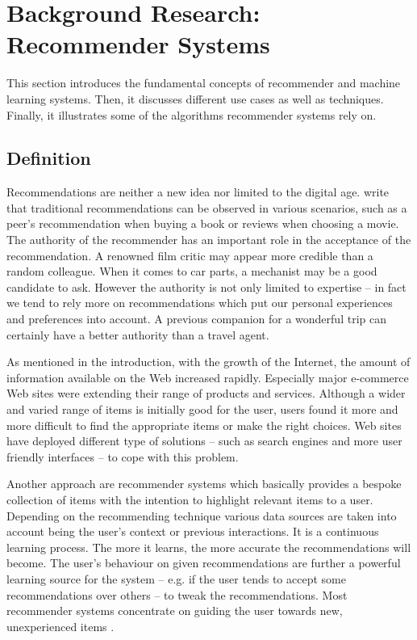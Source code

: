 \chapter{Background Research: Recommender Systems}

This section introduces the fundamental concepts of recommender and machine learning systems. Then, it discusses different use cases as well as techniques. Finally, it illustrates some of the algorithms recommender systems rely on.

\section{Definition}

Recommendations are neither a new idea nor limited to the digital age. \citet{ricci11} write that traditional recommendations can be observed in various scenarios, such as a peer's recommendation when buying a book or reviews when choosing a movie. The authority of the recommender has an important role in the acceptance of the recommendation. A renowned film critic may appear more credible than a random colleague. When it comes to car parts, a mechanist may be a good candidate to ask. However the authority is not only limited to expertise -- in fact we tend to rely more on recommendations which put our personal experiences and preferences into account. A previous companion for a wonderful trip can certainly have a better authority than a travel agent.

As mentioned in the introduction, with the growth of the Internet, the amount of information available on the Web increased rapidly. Especially major e-commerce Web sites were extending their range of products and services. Although a wider and varied range of items is initially good for the user, users found it more and more difficult to find the appropriate items or make the right choices. Web sites have deployed different type of solutions -- such as search engines and more user friendly interfaces -- to cope with this problem.

Another approach are recommender systems which basically provides a bespoke collection of items with the intention to highlight relevant items to a user. Depending on the recommending technique various data sources are taken into account being the user's context or previous interactions. It is a continuous learning process. The more it learns, the more accurate the recommendations will become. The user's behaviour on given recommendations are further a powerful learning source for the system -- e.g. if the user tends to accept some recommendations over others -- to tweak the recommendations. Most recommender systems concentrate on guiding the user towards new, unexperienced items \cite{ricci11}.

